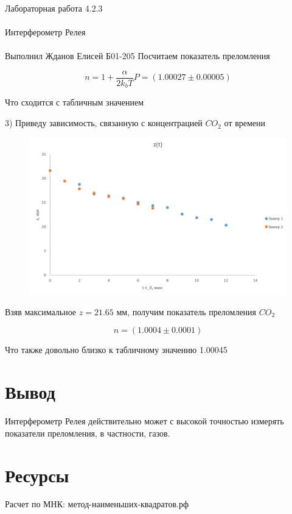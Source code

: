 \documentclass{astroedu-lab}
\begin{document}
\begin{problem}{\huge Лабораторная работа 4.2.3\\\\Интерферометр Релея\\\\Выполнил Жданов Елисей Б01-205}
Посчитаем показатель преломления

\begin{equation}
	n = 1 + \frac{\alpha}{2 k_b T} P = (1.00027 \pm 0.00005)
\end{equation}

Что сходится с табличным значением

3) Приведу зависимость, связанную с концентрацией $CO_2$ от времени

\begin{figure}[!h]
	\centering
	\includegraphics[width=1\textwidth]{co2.png}
	\label{fig:boiler}
\end{figure}

Взяв максимальное $z = 21.65$ мм, получим показатель преломления $CO_2$

\begin{equation}
	n = (1.0004 \pm 0.0001)
\end{equation}

Что также довольно близко к табличному значению 1.00045

\section{Вывод}

Интерферометр Релея действительно может с высокой точностью измерять показатели преломления, в частности, газов.

\section{Ресурсы}

Расчет по МНК: метод-наименьших-квадратов.рф


\end{problem}
\end{document}
